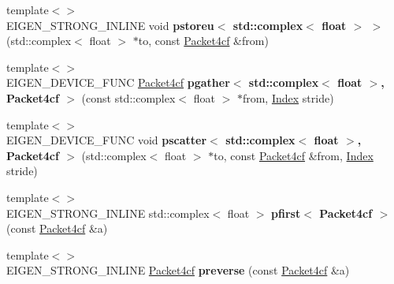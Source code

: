 \begin{DoxyCompactItemize}
{\footnotesize template$<$$>$ }\\E\+I\+G\+E\+N\+\_\+\+S\+T\+R\+O\+N\+G\+\_\+\+I\+N\+L\+I\+NE void {\bfseries pstoreu$<$ std\+::complex$<$ float $>$ $>$} (std\+::complex$<$ float $>$ $\ast$to, const \hyperlink{struct_eigen_1_1internal_1_1_packet4cf}{Packet4cf} \&from)
\item 
\mbox{\label{namespace_eigen_1_1internal_a4b2af3b412b5f172c08c31b50d89eca2}} 
{\footnotesize template$<$$>$ }\\E\+I\+G\+E\+N\+\_\+\+D\+E\+V\+I\+C\+E\+\_\+\+F\+U\+NC \hyperlink{struct_eigen_1_1internal_1_1_packet4cf}{Packet4cf} {\bfseries pgather$<$ std\+::complex$<$ float $>$, Packet4cf $>$} (const std\+::complex$<$ float $>$ $\ast$from, \hyperlink{namespace_eigen_a62e77e0933482dafde8fe197d9a2cfde}{Index} stride)
\item 
\mbox{\label{namespace_eigen_1_1internal_a03cc4a8e3cd7037c42517cbdcdf26115}} 
{\footnotesize template$<$$>$ }\\E\+I\+G\+E\+N\+\_\+\+D\+E\+V\+I\+C\+E\+\_\+\+F\+U\+NC void {\bfseries pscatter$<$ std\+::complex$<$ float $>$, Packet4cf $>$} (std\+::complex$<$ float $>$ $\ast$to, const \hyperlink{struct_eigen_1_1internal_1_1_packet4cf}{Packet4cf} \&from, \hyperlink{namespace_eigen_a62e77e0933482dafde8fe197d9a2cfde}{Index} stride)
\item 
\mbox{\label{namespace_eigen_1_1internal_a2c143bdb593bbecc4145ce5cdea5646c}} 
{\footnotesize template$<$$>$ }\\E\+I\+G\+E\+N\+\_\+\+S\+T\+R\+O\+N\+G\+\_\+\+I\+N\+L\+I\+NE std\+::complex$<$ float $>$ {\bfseries pfirst$<$ Packet4cf $>$} (const \hyperlink{struct_eigen_1_1internal_1_1_packet4cf}{Packet4cf} \&a)
\item 
\mbox{\label{namespace_eigen_1_1internal_af02a79eb793dbd21f24f138eedf0f655}} 
{\footnotesize template$<$$>$ }\\E\+I\+G\+E\+N\+\_\+\+S\+T\+R\+O\+N\+G\+\_\+\+I\+N\+L\+I\+NE \hyperlink{struct_eigen_1_1internal_1_1_packet4cf}{Packet4cf} {\bfseries preverse} (const \hyperlink{struct_eigen_1_1internal_1_1_packet4cf}{Packet4cf} \&a)
\item 
\mbox{\label{namespace_eigen_1_1internal_ae778e6c124b321ec5c819ae2a1aa101c}} 

\end{DoxyCompactItemize}
